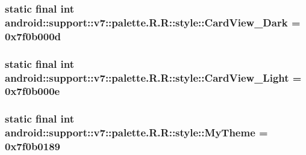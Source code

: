 \hypertarget{classandroid_1_1support_1_1v7_1_1palette_1_1_r_1_1style_b768427778aa5e43ebe4ecd454e28749}{
\subsubsection[{CardView\_\-Dark}]{\setlength{\rightskip}{0pt plus 5cm}static final int android::support::v7::palette.R.R::style::CardView\_\-Dark = 0x7f0b000d}}
\label{classandroid_1_1support_1_1v7_1_1palette_1_1_r_1_1style_b768427778aa5e43ebe4ecd454e28749}


\hypertarget{classandroid_1_1support_1_1v7_1_1palette_1_1_r_1_1style_7c5f766439d6fd251975f0f13e59d15e}{
\subsubsection[{CardView\_\-Light}]{\setlength{\rightskip}{0pt plus 5cm}static final int android::support::v7::palette.R.R::style::CardView\_\-Light = 0x7f0b000e}}
\label{classandroid_1_1support_1_1v7_1_1palette_1_1_r_1_1style_7c5f766439d6fd251975f0f13e59d15e}


\hypertarget{classandroid_1_1support_1_1v7_1_1palette_1_1_r_1_1style_1fdc6314cd5b92f344e3bfa5df14e63b}{
\subsubsection[{MyTheme}]{\setlength{\rightskip}{0pt plus 5cm}static final int android::support::v7::palette.R.R::style::MyTheme = 0x7f0b0189}}
\label{classandroid_1_1support_1_1v7_1_1palette_1_1_r_1_1style_1fdc6314cd5b92f344e3bfa5df14e63b}


